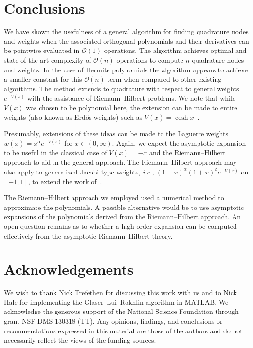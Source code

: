 \documentclass[final]{siamltex}
\begin{document}
\section*{Conclusions}

We have shown the usefulness of a general algorithm for finding quadrature nodes and weights when the 
associated orthogonal polynomials and their derivatives can be pointwise evaluated in $\mathcal O(1)$ operations.  
The algorithm achieves optimal and state-of-the-art complexity of $\mathcal O(n)$ operations to compute $n$ 
quadrature nodes and weights.  In the case of Hermite polynomials the algorithm appears to achieve a smaller 
constant for this $\mathcal O(n)$ term when compared to other existing algorithms.  The method extends to 
quadrature with respect to general weights $e^{-V(x)}$ with the assistance of Riemann--Hilbert problems.  
We note that while $V(x)$ was chosen to be polynomial here, the extension can be made to entire weights 
(also known as Erd\H{o}s weights) such as $V(x) = \cosh x$~\cite{TrogdonSOGaussQuad}.

Presumably, extensions of these ideas can be made to the Laguerre weights $w(x) = x^{\alpha} e^{-V(x)}$ 
for $x \in (0,\infty)$.  Again, we expect the asymptotic expansion to be useful in the classical case 
of $V(x) = -x$ and the Riemann--Hilbert approach to aid in the general approach.  The Riemann--Hilbert 
approach may also apply to generalized Jacobi-type weights, \emph{i.e.}, $(1-x)^\alpha (1+x)^\beta e^{-V(x)}$ 
on $[-1,1]$, to extend the work of~\cite{Hale_13_01}.

The Riemann--Hilbert approach we employed used a numerical method to approximate the polynomials.  
A possible alternative would be to use asymptotic expansions of the polynomials derived from the Riemann--Hilbert 
approach.  An open question remains as to whether a high-order expansion can be computed effectively from 
the asymptotic Riemann--Hilbert theory.

\section*{Acknowledgements} 
We wish to thank Nick Trefethen for discussing this work with us and to 
Nick Hale for implementing the Glaser--Lui--Rokhlin algorithm in MATLAB.  We acknowledge the 
generous support of the National Science Foundation through grant NSF-DMS-130318 (TT). Any opinions, 
findings, and conclusions or recommendations expressed in this material are those of the authors and 
do not necessarily reflect the views of the funding sources. 
\end{document}
